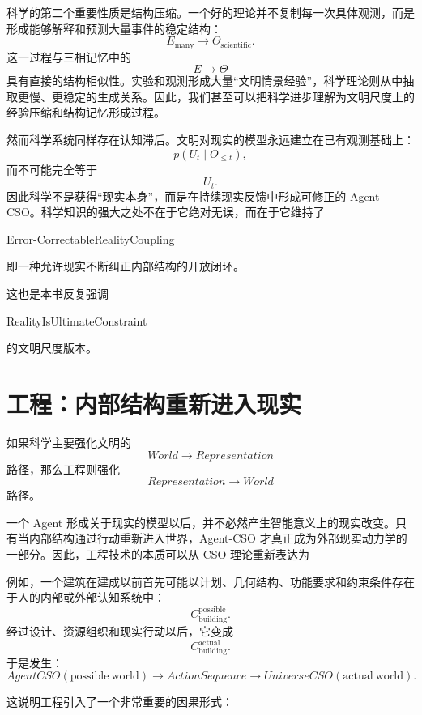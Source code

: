 科学的第二个重要性质是结构压缩。一个好的理论并不复制每一次具体观测，而是形成能够解释和预测大量事件的稳定结构：
\[
E_{\mathrm{many}}
\rightarrow
\Theta_{\mathrm{scientific}}.
\]
这一过程与三相记忆中的
\[
E\rightarrow\Theta
\]
具有直接的结构相似性。实验和观测形成大量“文明情景经验”，科学理论则从中抽取更慢、更稳定的生成关系。因此，我们甚至可以把科学进步理解为文明尺度上的经验压缩和结构记忆形成过程。

然而科学系统同样存在认知滞后。文明对现实的模型永远建立在已有观测基础上：
\[
p(
U_t
\mid
O_{\leq t}
),
\]
而不可能完全等于
\[
U_t.
\]
因此科学不是获得“现实本身”，而是在持续现实反馈中形成可修正的 Agent-CSO。科学知识的强大之处不在于它绝对无误，而在于它维持了
\begin{statementbox}
Error-CorrectableRealityCoupling
\end{statementbox}
即一种允许现实不断纠正内部结构的开放闭环。

这也是本书反复强调
\begin{statementbox}
RealityIsUltimateConstraint
\end{statementbox}
的文明尺度版本。


\section{工程：内部结构重新进入现实}

如果科学主要强化文明的
\[
World\rightarrow Representation
\]
路径，那么工程则强化
\[
Representation\rightarrow World
\]
路径。

一个 Agent 形成关于现实的模型以后，并不必然产生智能意义上的现实改变。只有当内部结构通过行动重新进入世界，Agent-CSO 才真正成为外部现实动力学的一部分。因此，工程技术的本质可以从 CSO 理论重新表达为
\begin{statementbox}
\centering
{}
\end{statementbox}

例如，一个建筑在建成以前首先可能以计划、几何结构、功能要求和约束条件存在于人的内部或外部认知系统中：
\[
C_{\mathrm{building}}^{\mathrm{possible}}.
\]
经过设计、资源组织和现实行动以后，它变成
\[
C_{\mathrm{building}}^{\mathrm{actual}}.
\]
于是发生：
\[
AgentCSO(\mathrm{possible\ world})
\rightarrow
ActionSequence
\rightarrow
UniverseCSO(\mathrm{actual\ world}).
\]

这说明工程引入了一个非常重要的因果形式：
\begin{statementbox}
\centering
{}
\end{statementbox}


